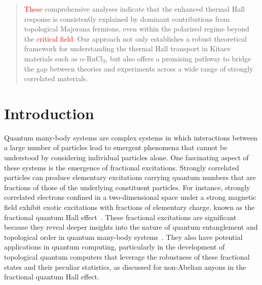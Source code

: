 \documentclass[twocolumn,superscriptaddress,showpacs, longbibliography, aps, prx]{revtex4-2}
\newcommand{\red}[1]{\textcolor{red}{#1}}
\begin{document}
\begin{abstract}
\red{These} comprehensive analyses indicate that the enhanced thermal Hall response is consistently explained by dominant contributions from topological Majorana fermions, even within the polarized regime beyond the %
\red{critical field}. 
Our approach not only establishes a robust theoretical framework for understanding the thermal Hall transport in Kitaev materials such as $\alpha$-RuCl$_{3}$, but also offers a promising pathway to bridge the gap between theories and experiments across a wide range of strongly correlated materials.
\end{abstract}
\maketitle
\section{Introduction}\label{sec:introduction}
Quantum many-body systems are complex systems in which interactions between a large number of particles lead to emergent phenomena that cannot be understood by considering individual particles alone. 
One fascinating aspect of these systems is the emergence of fractional excitations.
Strongly correlated particles can produce elementary excitations carrying quantum numbers that are fractions of those of the underlying constituent particles.  
For instance, strongly correlated electrons confined in a two-dimensional space under a strong magnetic field exhibit exotic excitations with fractions of elementary charge, known as the fractional quantum Hall effect~\cite{Laughlin1983, Wen1995}. 
These fractional excitations are significant because they reveal deeper insights into the nature of quantum entanglement and topological order in quantum many-body systems~\cite{Wen2007Book,Wen1990, KitaevP2006, LevinW2006}. 
They also have potential applications in quantum computing, particularly in the development of topological quantum computers that leverage the robustness of these fractional states and their peculiar statistics, as discussed for non-Abelian anyons in the fractional quantum Hall effect.
\end{document}

